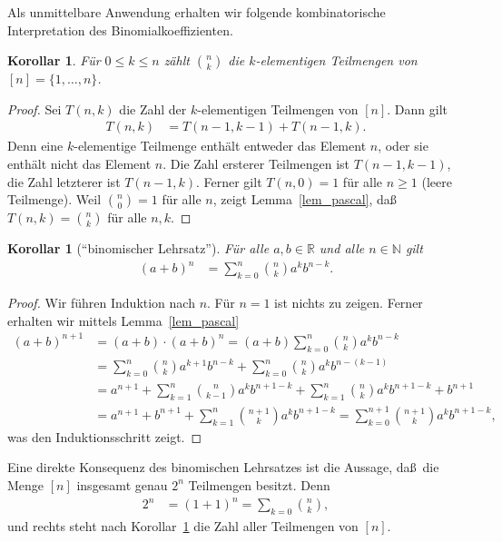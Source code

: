 \documentclass[10pt,reqno]{amsart}
\numberwithin{equation}{section}
\newcommand\NN{\mathbb N}
\newcommand\RR{\mathbb R}
\newtheorem{corollary}[definition]{Korollar}
\newcommand\Lem{Lemma}
\newcommand\Cor{Korollar}
\begin{document}
Als unmittelbare Anwendung erhalten wir folgende kombinatorische Interpretation des Binomialkoeffizienten.

\begin{corollary}\label{cor_pascal}
	F\"ur $0\leq k\leq n$ z\"ahlt $\binom nk$ die $k$-elementigen Teilmengen von $[n]=\{1,\ldots,n\}$.
\end{corollary}
\begin{proof}
	Sei $T(n,k)$ die Zahl der $k$-elementigen Teilmengen von $[n]$.
	Dann gilt
	\begin{align*}
		T(n,k)&=T(n-1,k-1)+T(n-1,k).
	\end{align*}
	Denn eine $k$-elementige Teilmenge enth\"alt entweder das Element $n$, oder sie enth\"alt nicht das Element $n$.
	Die Zahl ersterer Teilmengen ist $T(n-1,k-1)$, die Zahl letzterer ist $T(n-1,k)$.
	Ferner gilt $T(n,0)=1$ f\"ur alle $n\geq1$ (leere Teilmenge).
	Weil $\binom n0=1$ f\"ur alle $n$, zeigt \Lem~\ref{lem_pascal}, da\ss\ $T(n,k)=\binom nk$ f\"ur alle $n,k$.
\end{proof}

\begin{corollary}[``binomischer Lehrsatz'']\label{cor_binom}
	F\"ur alle $a,b\in\RR$ und alle $n\in\NN$ gilt
	\begin{align*}
		(a+b)^n&=\sum_{k=0}^n\binom nka^kb^{n-k}.
	\end{align*}
\end{corollary}
\begin{proof}
	Wir f\"uhren Induktion nach $n$.
	F\"ur $n=1$ ist nichts zu zeigen.
	Ferner erhalten wir mittels \Lem~\ref{lem_pascal}
	\begin{align*}
		(a+b)^{n+1}&=(a+b)\cdot(a+b)^n=(a+b)\sum_{k=0}^n\binom nka^kb^{n-k}\\
				   &=\sum_{k=0}^n\binom{n}ka^{k+1}b^{n-k}+\sum_{k=0}^n\binom{n}ka^{k}b^{n-(k-1)}\\
				   &=a^{n+1}+\sum_{k=1}^n\binom{n}{k-1}a^kb^{n+1-k}+\sum_{k=1}^n\binom nka^kb^{n+1-k}+b^{n+1}\\
				   &=a^{n+1}+b^{n+1}+\sum_{k=1}^n\binom{n+1}ka^kb^{n+1-k}=\sum_{k=0}^{n+1}\binom {n+1}ka^kb^{n+1-k},
	\end{align*}
	was den Induktionsschritt zeigt.
\end{proof}

Eine direkte Konsequenz des binomischen Lehrsatzes ist die Aussage, da\ss\ die Menge $[n]$ insgesamt genau $2^n$ Teilmengen besitzt.
Denn
\begin{align*}
	2^n&=(1+1)^n=\sum_{k=0}\binom nk,
\end{align*}
und rechts steht nach \Cor~\ref{cor_pascal} die Zahl aller Teilmengen von $[n]$.
\end{document}
